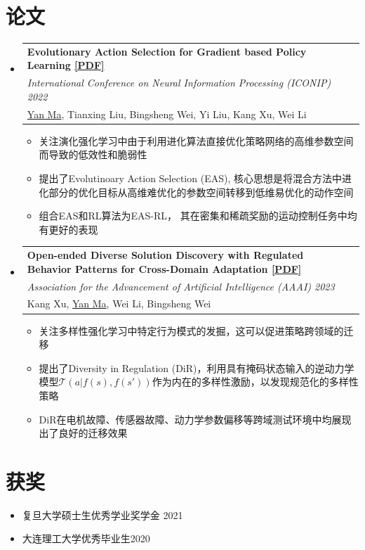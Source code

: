 \documentclass{resume}
\makeatletter
\newcommand{\Paper}[3]{
  \vspace{-1pt}\item
    \begin{tabular*}{0.97\textwidth}[t]{l@{\extracolsep{\fill}}r}
    \vspace{-2pt}
      \textbf{#1} \\ \vspace{-2pt}
      {#2} \\ \vspace{-2pt}
      {#3} \\ 
    \end{tabular*} \vspace{3pt}
}
\newcommand{\resumeSubHeadingListStart}{\begin{itemize}[leftmargin=*]}
\newcommand{\resumeSubHeadingListEnd}{\end{itemize}}
\makeatother
\begin{document}
\section{论文}
  \resumeSubHeadingListStart
  \Paper
  {Evolutionary Action Selection for Gradient based Policy Learning \small \href{https://arxiv.org/abs/2201.04286}{[PDF]}}
  {\textit{International Conference on Neural Information Processing (ICONIP) 2022}}
  {\underline{Yan Ma}, Tianxing Liu, Bingsheng Wei, Yi Liu, Kang Xu, Wei Li}
  \begin{itemize}
    \item 关注演化强化学习中由于利用进化算法直接优化策略网络的高维参数空间而导致的低效性和脆弱性%
    \item
    提出了Evolutinoary Action Selection (EAS), 核心思想是将混合方法中进化部分的优化目标从高维难优化的参数空间转移到低维易优化的动作空间
    \item 组合EAS和RL算法为EAS-RL，    其在密集和稀疏奖励的运动控制任务中均有更好的表现
    \end{itemize}
  \Paper
  {Open-ended Diverse Solution Discovery with Regulated Behavior Patterns for Cross-Domain Adaptation \small \href{https://arxiv.org/abs/2209.12029}{[PDF]}}
  {\textit{Association for the Advancement of Artificial Intelligence (AAAI) 2023}}
  {Kang Xu, \underline{Yan Ma}, Wei Li, Bingsheng Wei}
  \begin{itemize}
    \item 关注多样性强化学习中特定行为模式的发掘，这可以促进策略跨领域的迁移
    \item 提出了Diversity in Regulation (DiR)，利用具有掩码状态输入的逆动力学模型$\mathcal{T}(a|f(s),f(s'))$作为内在的多样性激励，以发现规范化的多样性策略
    \item DiR在电机故障、传感器故障、动力学参数偏移等跨域测试环境中均展现出了良好的迁移效果
    \end{itemize}
  \resumeSubHeadingListEnd


\section{获奖}
\begin{itemize}
    \item 复旦大学硕士生优秀学业奖学金 \hfill 2021
    \item 大连理工大学优秀毕业生\hfill 2020
\end{itemize}
\end{document}
